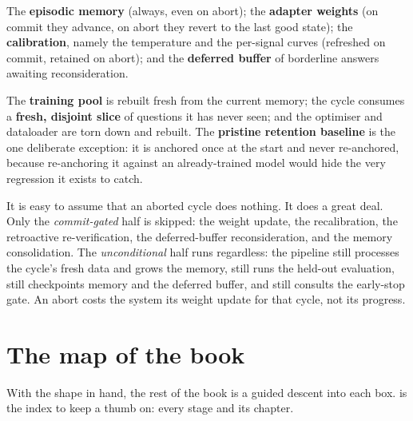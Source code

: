 \begin{description}[leftmargin=0pt, labelsep=0.5em, style=nextline]
  \item[Carries forward.] The \textbf{episodic memory} (always, even on abort);
  the \textbf{adapter weights} (on commit they advance, on abort they revert to
  the last good state); the \textbf{calibration}, namely the temperature and the
  per-signal curves (refreshed on commit, retained on abort); and the
  \textbf{deferred buffer} of borderline answers awaiting reconsideration.
  \item[Resets each cycle.] The \textbf{training pool} is rebuilt fresh from the
  current memory; the cycle consumes a \textbf{fresh, disjoint slice} of
  questions it has never seen; and the optimiser and dataloader are torn down and
  rebuilt. The \textbf{pristine retention baseline} is the one deliberate
  exception: it is anchored once at the start and never re-anchored, because
  re-anchoring it against an already-trained model would hide the very
  regression it exists to catch.
\end{description}

\begin{pitfall}
It is easy to assume that an aborted cycle does nothing. It does a great deal.
Only the \emph{commit-gated} half is skipped: the weight update, the
recalibration, the retroactive re-verification, the deferred-buffer
reconsideration, and the memory consolidation. The \emph{unconditional} half runs
regardless: the pipeline still processes the cycle's fresh data and grows the
memory, still runs the held-out evaluation, still checkpoints memory and the
deferred buffer, and still consults the early-stop gate. An abort costs the
system its weight update for that cycle, not its progress.
\end{pitfall}

\section{The map of the book}
\label{sec:book-map}

With the shape in hand, the rest of the book is a guided descent into each box.
 is the index to keep a thumb on: every stage and its chapter.

